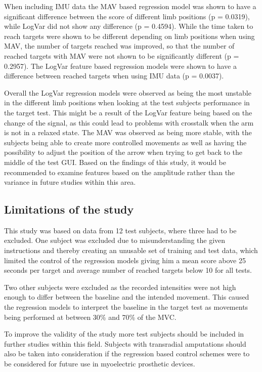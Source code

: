 	When including IMU data the MAV based regression model was shown to have a significant difference between the score of different limb positions (p = 0.0319), while LogVar did not show any difference (p = 0.4594). While the time taken to reach targets were shown to be different depending on limb positions when using MAV, the number of targets reached was improved, so that the number of reached targets with MAV were not shown to be significantly different (p = 0.2957). The LogVar feature based regression models were shown to have a difference between reached targets when using IMU data (p = 0.0037).
	
	Overall the LogVar regression models were observed as being the most unstable in the different limb positions when looking at the test subjects performance in the target test. This might be a result of the LogVar feature being based on the change of the signal, as this could lead to problems with crosstalk when the arm is not in a relaxed state. The MAV was observed as being more stable, with the subjects being able to create more controlled movements as well as having the possibility to adjust the position of the arrow when trying to get back to the middle of the test GUI. Based on the findings of this study, it would be recommended to examine features based on the amplitude rather than the variance in future studies within this area.
	
	\subsection{Limitations of the study}
	This study was based on data from 12 test subjects, where three had to be excluded. One subject was excluded due to misunderstanding the given instructions and thereby creating an unusable set of training and test data, which limited the control of the regression models giving him a mean score above 25 seconds per target and average number of reached targets below 10 for all tests.
	
	Two other subjects were excluded as the recorded intensities were not high enough to differ between the baseline and the intended movement. This caused the regression models to interpret the baseline in the target test as movements being performed at between 30\% and 70\% of the MVC.
	
	To improve the validity of the study more test subjects should be included in further studies within this field. Subjects with transradial amputations should also be taken into consideration if the regression based control schemes were to be considered for future use in myoelectric prosthetic devices. 
	
